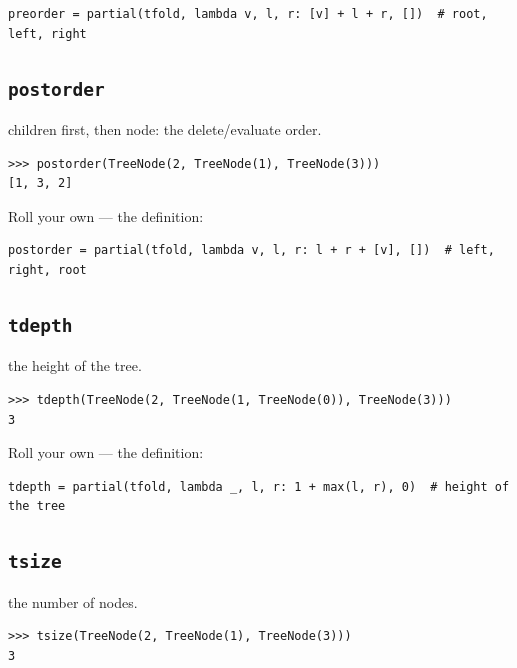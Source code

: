 \documentclass[10pt,letterpaper]{book}
\begin{document}
\begin{lstlisting}[style=ex]
preorder = partial(tfold, lambda v, l, r: [v] + l + r, [])  # root, left, right
\end{lstlisting}

\subsection{\texttt{postorder}}\label{def:postorder}
children first, then node: the delete/evaluate order.
\begin{lstlisting}[style=ex]
>>> postorder(TreeNode(2, TreeNode(1), TreeNode(3)))
[1, 3, 2]
\end{lstlisting}

Roll your own --- the definition:

\begin{lstlisting}[style=ex]
postorder = partial(tfold, lambda v, l, r: l + r + [v], [])  # left, right, root
\end{lstlisting}

\subsection{\texttt{tdepth}}\label{def:tdepth}
the height of the tree.
\begin{lstlisting}[style=ex]
>>> tdepth(TreeNode(2, TreeNode(1, TreeNode(0)), TreeNode(3)))
3
\end{lstlisting}

Roll your own --- the definition:

\begin{lstlisting}[style=ex]
tdepth = partial(tfold, lambda _, l, r: 1 + max(l, r), 0)  # height of the tree
\end{lstlisting}

\subsection{\texttt{tsize}}\label{def:tsize}
the number of nodes.
\begin{lstlisting}[style=ex]
>>> tsize(TreeNode(2, TreeNode(1), TreeNode(3)))
3
\end{lstlisting}
\end{document}
